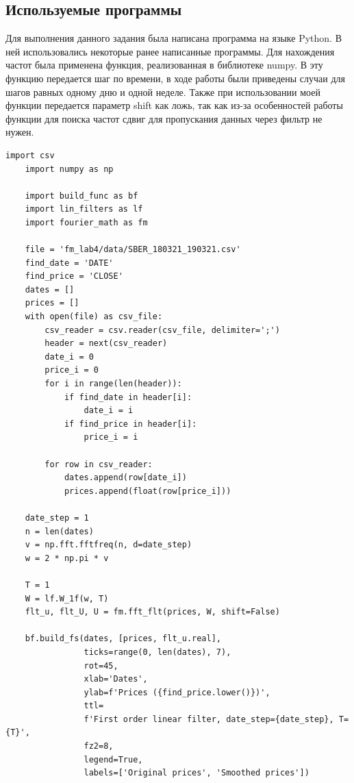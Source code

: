 \documentclass[a4paper, 12pt]{article}
\begin{document}
    \subsection{Используемые программы}
    Для выполнения данного задания была написана программа на языке Python. В ней использовались
    некоторые ранее написанные программы. Для нахождения частот была применена функция, реализованная
    в библиотеке numpy. В эту функцию передается шаг по времени, в ходе работы были приведены случаи для
    шагов равных одному дню и одной неделе. Также при использовании моей функции передается параметр shift
    как ложь, так как из-за особенностей работы функции для поиска частот сдвиг для пропускания данных
    через фильтр не нужен.
    \begin{lstlisting}[label=task3, caption={Программа для сглаживания биржевых данных}]
    import csv
    import numpy as np

    import build_func as bf
    import lin_filters as lf
    import fourier_math as fm

    file = 'fm_lab4/data/SBER_180321_190321.csv'
    find_date = 'DATE'
    find_price = 'CLOSE'
    dates = []
    prices = []
    with open(file) as csv_file:
        csv_reader = csv.reader(csv_file, delimiter=';')
        header = next(csv_reader)
        date_i = 0
        price_i = 0
        for i in range(len(header)):
            if find_date in header[i]:
                date_i = i
            if find_price in header[i]:
                price_i = i

        for row in csv_reader:
            dates.append(row[date_i])
            prices.append(float(row[price_i]))

    date_step = 1
    n = len(dates)
    v = np.fft.fftfreq(n, d=date_step)
    w = 2 * np.pi * v

    T = 1
    W = lf.W_1f(w, T)
    flt_u, flt_U, U = fm.fft_flt(prices, W, shift=False)

    bf.build_fs(dates, [prices, flt_u.real],
                ticks=range(0, len(dates), 7),
                rot=45,
                xlab='Dates',
                ylab=f'Prices ({find_price.lower()})',
                ttl=
                f'First order linear filter, date_step={date_step}, T={T}',
                fz2=8,
                legend=True,
                labels=['Original prices', 'Smoothed prices'])
    \end{lstlisting}
\end{document}
